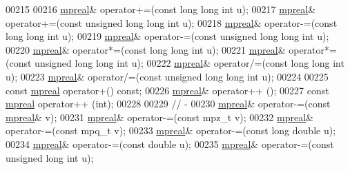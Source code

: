 \begin{DoxyCode}
00215 
00216     \hyperlink{classmpfr_1_1mpreal}{mpreal}& operator+=(\textcolor{keyword}{const} \textcolor{keywordtype}{long} \textcolor{keywordtype}{long} \textcolor{keywordtype}{int}  u);
00217     \hyperlink{classmpfr_1_1mpreal}{mpreal}& operator+=(\textcolor{keyword}{const} \textcolor{keywordtype}{unsigned} \textcolor{keywordtype}{long} \textcolor{keywordtype}{long} \textcolor{keywordtype}{int} u);
00218     \hyperlink{classmpfr_1_1mpreal}{mpreal}& operator-=(\textcolor{keyword}{const} \textcolor{keywordtype}{long} \textcolor{keywordtype}{long} \textcolor{keywordtype}{int}  u);
00219     \hyperlink{classmpfr_1_1mpreal}{mpreal}& operator-=(\textcolor{keyword}{const} \textcolor{keywordtype}{unsigned} \textcolor{keywordtype}{long} \textcolor{keywordtype}{long} \textcolor{keywordtype}{int} u);
00220     \hyperlink{classmpfr_1_1mpreal}{mpreal}& operator*=(\textcolor{keyword}{const} \textcolor{keywordtype}{long} \textcolor{keywordtype}{long} \textcolor{keywordtype}{int}  u);
00221     \hyperlink{classmpfr_1_1mpreal}{mpreal}& operator*=(\textcolor{keyword}{const} \textcolor{keywordtype}{unsigned} \textcolor{keywordtype}{long} \textcolor{keywordtype}{long} \textcolor{keywordtype}{int} u);
00222     \hyperlink{classmpfr_1_1mpreal}{mpreal}& operator/=(\textcolor{keyword}{const} \textcolor{keywordtype}{long} \textcolor{keywordtype}{long} \textcolor{keywordtype}{int}  u);
00223     \hyperlink{classmpfr_1_1mpreal}{mpreal}& operator/=(\textcolor{keyword}{const} \textcolor{keywordtype}{unsigned} \textcolor{keywordtype}{long} \textcolor{keywordtype}{long} \textcolor{keywordtype}{int} u);
00224 
00225     \textcolor{keyword}{const} \hyperlink{classmpfr_1_1mpreal}{mpreal} operator+() \textcolor{keyword}{const};
00226     \hyperlink{classmpfr_1_1mpreal}{mpreal}& operator++ ();
00227     \textcolor{keyword}{const} \hyperlink{classmpfr_1_1mpreal}{mpreal}  operator++ (\textcolor{keywordtype}{int});
00228 
00229     \textcolor{comment}{// -}
00230     \hyperlink{classmpfr_1_1mpreal}{mpreal}& operator-=(\textcolor{keyword}{const} \hyperlink{classmpfr_1_1mpreal}{mpreal}& v);
00231     \hyperlink{classmpfr_1_1mpreal}{mpreal}& operator-=(\textcolor{keyword}{const} mpz\_t v);
00232     \hyperlink{classmpfr_1_1mpreal}{mpreal}& operator-=(\textcolor{keyword}{const} mpq\_t v);
00233     \hyperlink{classmpfr_1_1mpreal}{mpreal}& operator-=(\textcolor{keyword}{const} \textcolor{keywordtype}{long} \textcolor{keywordtype}{double} u);
00234     \hyperlink{classmpfr_1_1mpreal}{mpreal}& operator-=(\textcolor{keyword}{const} \textcolor{keywordtype}{double} u);
00235     \hyperlink{classmpfr_1_1mpreal}{mpreal}& operator-=(\textcolor{keyword}{const} \textcolor{keywordtype}{unsigned} \textcolor{keywordtype}{long} \textcolor{keywordtype}{int} u);

\end{DoxyCode}
